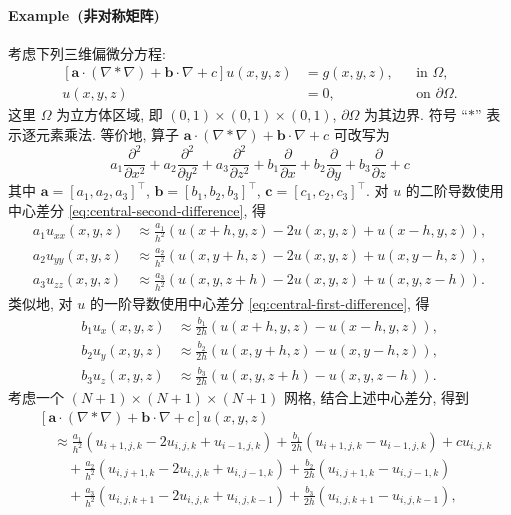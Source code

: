 \paragraph{Example~\theapplicationexample\space({非对称矩阵})}\label{subsec:nonsymmetric-difference}
\begingroup\makeatletter\edef\@currentlabel{\theapplicationexample}\label{ex:nonsymmetric-difference}\makeatother\endgroup
{考虑下列三维偏微分方程:}
\[\begin{aligned}
[\boldsymbol{a}\cdot(\nabla*\nabla)+\boldsymbol{b}\cdot\nabla+c]u(x,y,z)&=g(x,y,z),&&\text{in }\Omega,\\
u(x,y,z)&=0,&&\text{on }\partial\Omega.
\end{aligned}\]
{这里 $\Omega$ 为立方体区域, 即 $(0,1)\times(0,1)\times(0,1)$, $\partial\Omega$ 为其边界. 符号 ``$*$'' 表示逐元素乘法. 等价地, 算子 $\boldsymbol{a}\cdot(\nabla*\nabla)+\boldsymbol{b}\cdot\nabla+c$ 可改写为}
\[a_1\frac{\partial^2}{\partial x^2}+a_2\frac{\partial^2}{\partial y^2}+a_3\frac{\partial^2}{\partial z^2}+b_1\frac{\partial}{\partial x}+b_2\frac{\partial}{\partial y}+b_3\frac{\partial}{\partial z}+c\]
{其中 $\boldsymbol{a}=[a_1,a_2,a_3]^{\top}$, $\boldsymbol{b}=[b_1,b_2,b_3]^{\top}$, $\boldsymbol{c}=[c_1,c_2,c_3]^{\top}$. 对 $u$ 的二阶导数使用中心差分 \eqref{eq:central-second-difference}, 得}
\[\begin{aligned}
a_1u_{xx}(x,y,z)&\approx\frac{a_1}{h^2}(u(x+h,y,z)-2u(x,y,z)+u(x-h,y,z)),\\
a_2u_{yy}(x,y,z)&\approx\frac{a_2}{h^2}(u(x,y+h,z)-2u(x,y,z)+u(x,y-h,z)),\\
a_3u_{zz}(x,y,z)&\approx\frac{a_3}{h^2}(u(x,y,z+h)-2u(x,y,z)+u(x,y,z-h)).
\end{aligned}\]
{类似地, 对 $u$ 的一阶导数使用中心差分 \eqref{eq:central-first-difference}, 得}
\[\begin{aligned}
b_1u_x(x,y,z)&\approx\frac{b_1}{2h}(u(x+h,y,z)-u(x-h,y,z)),\\
b_2u_y(x,y,z)&\approx\frac{b_2}{2h}(u(x,y+h,z)-u(x,y-h,z)),\\
b_3u_z(x,y,z)&\approx\frac{b_3}{2h}(u(x,y,z+h)-u(x,y,z-h)).
\end{aligned}\]
{考虑一个 $(N+1)\times(N+1)\times(N+1)$ 网格, 结合上述中心差分, 得到}
\[\begin{aligned}
&[\boldsymbol{a}\cdot(\nabla*\nabla)+\boldsymbol{b}\cdot\nabla+c]u(x,y,z)\\
&\quad\approx\frac{a_1}{h^2}(u_{i+1,j,k}-2u_{i,j,k}+u_{i-1,j,k})+\frac{b_1}{2h}(u_{i+1,j,k}-u_{i-1,j,k})+cu_{i,j,k}\\
&\qquad+\frac{a_2}{h^2}(u_{i,j+1,k}-2u_{i,j,k}+u_{i,j-1,k})+\frac{b_2}{2h}(u_{i,j+1,k}-u_{i,j-1,k})\\
&\qquad+\frac{a_3}{h^2}(u_{i,j,k+1}-2u_{i,j,k}+u_{i,j,k-1})+\frac{b_3}{2h}(u_{i,j,k+1}-u_{i,j,k-1}),
\end{aligned}\]
